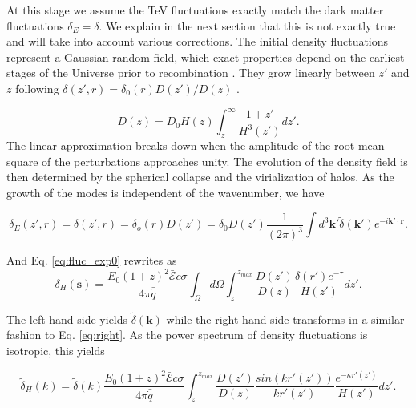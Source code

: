 \documentclass[twocolumns]{emulateapj}
\begin{document}

At this stage we assume the TeV fluctuations exactly match the dark matter fluctuations $\delta_E=\delta$.  We explain in the next section that this is not exactly true and will take into account various corrections.  The initial density fluctuations represent a Gaussian random field, which exact properties depend on the earliest stages of the Universe prior to recombination \citep{1986ApJ...304...15B,Peebles}. They grow linearly between $z'$ and $z$ following $\delta(z',r)=\delta_0(r)D(z')/D(z)$ \citep{ 1977MNRAS.179..351H}.

\begin{equation}
  \label{eq:growth_1}
  D(z)=D_0H(z)\int_z^{\infty}\frac{1+z'}{H^3(z')}dz'.
\end{equation}
The linear approximation breaks down when the amplitude of the root mean square of the perturbations approaches unity. The evolution of the density field is then determined by the spherical collapse \citep{1972ApJ...176....1G} and the virialization of halos. As the growth of the modes is independent of the wavenumber, we have

\begin{equation}
  \label{eq:FT_delta}
  \delta_E(z',r)=\delta(z',r)=\delta_o(r)D(z')=\delta_0D(z')\frac{1}{(2\pi)^3}\int d^3\mathbf{k'} \tilde{\delta}(\mathbf{k'}) e^{-i\mathbf{k'}\cdot\mathbf{r}}.
\end{equation}


And Eq. \ref{eq:fluc_exp0}  rewrites as
\begin{equation}
  \label{eq:heat_fluc_exp0}
  \delta_H(\mathbf{s})=\frac{ E_0(1+z)^2 \bar{\mathcal{E}} c\sigma}{4\pi\bar{\dot{q}}} \int_{\Omega}d\Omega\int_z^{z_{max}}  \frac{D(z')}{D(z)} \frac{\delta(r') e^{-\tau}}{H(z')}dz'.
\end{equation}


The left hand side yields $\tilde{\delta}(\mathbf{k})$ while the right hand side transforms in a similar fashion to Eq. \ref{eq:right}. As the power spectrum of density fluctuations is isotropic, this  yields

\begin{equation}
  \label{eq:heat_fluc_exp1}
  \tilde{\delta}_H(k)=\tilde{\delta}(k) \frac{E_0(1+z)^2\bar{\mathcal{E}}c\sigma}{4\pi\bar{\dot{q}}} \int_z^{z_{max}} \frac{D(z')}{D(z)}\frac{sin(kr'(z'))}{kr'(z')}    \frac{e^{-\kappa r'(z')}} {H(z')}  dz'.
\end{equation}
\end{document}
